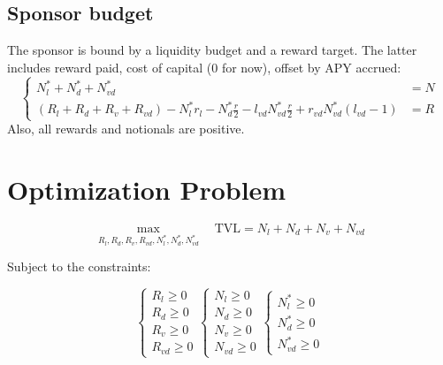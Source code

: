 \documentclass{article}
\begin{document}
\subsection{Sponsor budget}

The sponsor is bound by a liquidity budget and a reward target.
The latter includes reward paid, cost of capital (0 for now), offset by APY accrued:
\begin{equation}
    \left\{
    \begin{aligned}
    N_l^* + N_d^* + N_{vd}^* &= N\\
    (R_l+R_d+R_v+R_{vd}) - N_l^* r_l - N_d^* \frac{r}{2} 
    - l_{vd} N_{vd}^* \frac{r}{2} + r_{vd} N_{vd}^* (l_{vd}-1) &= R
    \end{aligned}
    \right.
\end{equation}
Also, all rewards and notionals are positive.

\section{Optimization Problem}

\begin{equation}
    \max_{R_l, R_d, R_v, R_{vd}, N_l^*, N_d^*, N_{vd}^*} \quad \text{TVL} = N_l + N_d + N_v + N_{vd}
\end{equation}

Subject to the constraints:

\begin{equation}
    \left\{
    \begin{aligned}
    R_l \geq 0 \\
    R_d \geq 0 \\
    R_v \geq 0 \\
    R_{vd} \geq 0
    \end{aligned}
    \right.
    \left\{
    \begin{aligned}
    N_l \geq 0 \\
    N_d \geq 0 \\
    N_v \geq 0 \\
    N_{vd} \geq 0
    \end{aligned}
    \right.
    \left\{
    \begin{aligned}
    N_l^* \geq 0 \\
    N_d^* \geq 0 \\
    N_{vd}^* \geq 0
    \end{aligned}
    \right.
\end{equation}
\end{document}
